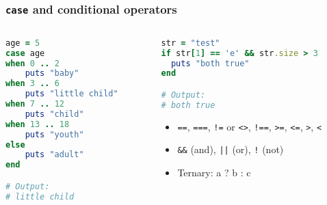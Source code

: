 \begin{frame}[fragile]\frametitle{\texttt{case} and conditional operators}

\begin{columns}[c] 

\begin{column}{5cm}

\begin{lstlisting}[language=ruby]
age = 5
case age
when 0 .. 2
    puts "baby"
when 3 .. 6
    puts "little child"
when 7 .. 12
    puts "child"
when 13 .. 18
    puts "youth"
else
    puts "adult"
end

# Output:
# little child
\end{lstlisting}
\pause
\end{column}

\begin{column}{6cm}
\begin{lstlisting}[language=ruby]
str = "test"
if str[1] == 'e' && str.size > 3
  puts "both true"
end

# Output:
# both true
\end{lstlisting}
\pause
\begin{itemize}
\item \texttt{==}, \texttt{===}, \texttt{!=} or \texttt{<>}, \texttt{!==}, \texttt{>=}, \texttt{<=}, \texttt{>}, \texttt{<}   
\item \texttt{\&\&} (and), \texttt{||} (or), \texttt{!} (not)
\item Ternary: a ? b : c
\end{itemize}

\end{column}

\end{columns}

\end{frame}




